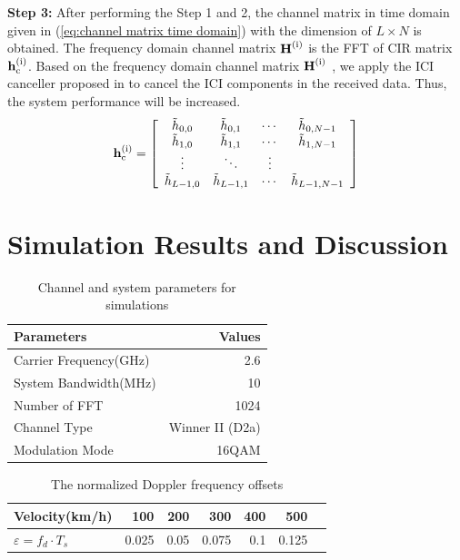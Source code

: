 \documentclass[AMA]{WileyNJD-v1}
\begin{document}
{{			
\rm{\textbf {Step 3:} After performing the Step 1 and 2, the channel matrix in time domain given in (\ref{eq:channel matrix time domain}) with the dimension of $L \times N$ is obtained. The frequency domain channel matrix $\rm{\textbf H^{(i)}}$ is the FFT of CIR matrix  $\rm{\textbf h^{(i)}_{c}}$. Based on the frequency domain channel matrix $\rm{\textbf H^{(i)}}$ , we apply the ICI canceller proposed in \cite{Qiu2010} to cancel the ICI components in the received data. Thus, the system performance will be increased.
%
\begin{equation}\label{eq:channel matrix time domain}
	{
		\rm{\textbf h^{(i)}_{c}}=\left[\begin{array}{cccc}
		{\tilde{h}_{0,0}}& \tilde{h}_{0,1} &  \cdots &  \tilde{h}_{0,N-1} \\
		\tilde{h}_{1,0}&  \tilde{h}_{1,1}&  \cdots &  \tilde{h}_{1,N-1} \\
			\vdots &  \ddots&  \vdots \\
		\tilde{h}_{L-1,0}&  \tilde{h}_{L-1,1}&  \cdots &  \tilde{h}_{L-1,N-1}
		\end{array}\right]}
\end{equation}
%
				
\section{Simulation Results and Discussion}\label{section-4}
	\begin{table}
		\centering
		\caption{Channel and system parameters for simulations}
		\label{ta:parameters}
					\begin{center}
						\begin{tabular}{|l|r|}
							\hline 	
							Parameters & Values\\
							\hline 
							Carrier Frequency(GHz)  &  2.6   \\
							\hline
							System Bandwidth(MHz) & 10\\
							\hline
							Number of FFT & 1024\\
							\hline
							Channel Type & Winner II (D2a)\\
							\hline
							Modulation Mode & 16QAM\\	
							\hline
							
		\end{tabular}
	\end{center}
\end{table}
				
				
\begin{table}
		\centering
		\caption{The normalized Doppler frequency offsets}
		\label{ta:Normalize-frequency-offset}
		\begin{center}
			\begin{tabular}{|l|r|r|r|r|r|r|}
				\hline 	
				Velocity(km/h) & 100 & 200 & 300 & 400 & 500  \\
				\hline 
			{$\varepsilon=f_{d} \cdot T_{s} $} & 0.025 &0.05 & 0.075 & 0.1 & 0.125 \\
				\hline 
			\end{tabular}
		\end{center}
\end{table}
				
}}}
\end{document}
